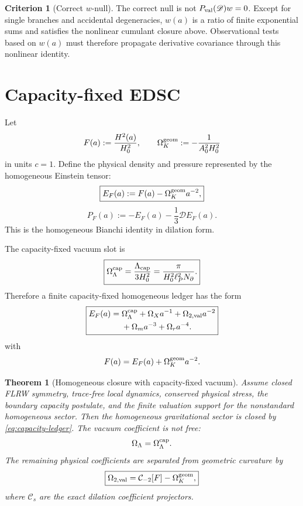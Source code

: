 \documentclass[aps,prd,reprint,nofootinbib,superscriptaddress,floatfix]{revtex4-2}
\numberwithin{equation}{section}
\theoremstyle{definition}
\newtheorem{criterion}{Criterion}[section]
\theoremstyle{plain}
\newtheorem{theorem}{Theorem}[section]
\newcommand{\Dil}{\mathscr D}
\newcommand{\Ncap}{N_{\partial}}
\begin{document}
\begin{criterion}[Correct \(w\)-null]
The correct null is not \(P_{\rm val}(\Dil)w=0\).  Except for single branches and accidental degeneracies, \(w(a)\) is a ratio of finite exponential sums and satisfies the nonlinear cumulant closure above.  Observational tests based on \(w(a)\) must therefore propagate derivative covariance through this nonlinear identity.
\end{criterion}

\section{Capacity-fixed EDSC}

Let
\begin{equation}
F(a):=\frac{H^2(a)}{H_0^2},
\qquad
\Omega_K^{\rm geom}:=-\frac{1}{A_0^2H_0^2}
\end{equation}
in units \(c=1\).  Define the physical density and pressure represented by the homogeneous Einstein tensor:
\begin{equation}
\boxed{
E_F(a):=F(a)-\Omega_K^{\rm geom}a^{-2},
}
\end{equation}
\begin{equation}
\boxed{
P_F(a):=-E_F(a)-\frac13\Dil E_F(a).
}
\end{equation}
This is the homogeneous Bianchi identity in dilation form.

The capacity-fixed vacuum slot is
\begin{equation}
\boxed{
\Omega_\Lambda^{\rm cap}
=
\frac{\Lambda_{\rm cap}}{3H_0^2}
=
\frac{\pi}{H_0^2\ell_P^2\Ncap}.
}
\end{equation}
Therefore a finite capacity-fixed homogeneous ledger has the form
\begin{equation}
\boxed{\begin{aligned}
E_F(a)
={}&\Omega_\Lambda^{\rm cap}
+\Omega_Xa^{-1}
+\Omega_{2,\rm val}a^{-2}\\
&+\Omega_ma^{-3}
+\Omega_ra^{-4}.
\end{aligned}}
\label{eq:capacity-ledger}
\end{equation}
with
\begin{equation}
F(a)=E_F(a)+\Omega_K^{\rm geom}a^{-2}.
\end{equation}

\begin{theorem}[Homogeneous closure with capacity-fixed vacuum]\label{thm:capacity-edsc}
Assume closed FLRW symmetry, trace-free local dynamics, conserved physical stress, the boundary capacity postulate, and the finite valuation support for the nonstandard homogeneous sector.  Then the homogeneous gravitational sector is closed by \eqref{eq:capacity-ledger}.  The vacuum coefficient is not free:
\[
\Omega_\Lambda=\Omega_\Lambda^{\rm cap}.
\]
The remaining physical coefficients are separated from geometric curvature by
\[
\boxed{
\Omega_{2,\rm val}=\mathcal C_{-2}[F]-\Omega_K^{\rm geom},
}
\]
where \(\mathcal C_s\) are the exact dilation coefficient projectors.
\end{theorem}
\end{document}
